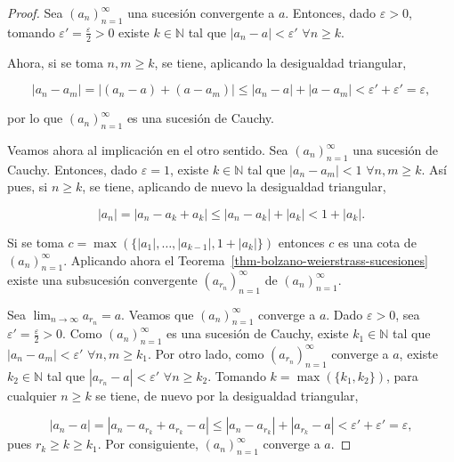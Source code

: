 \documentclass[
  a4paper,
]{scrreport}
\theoremstyle{definition}
\theoremstyle{plain}
\theoremstyle{definition}
\theoremstyle{definition}
\theoremstyle{plain}
\theoremstyle{plain}
\theoremstyle{remark}
\begin{document}
\begin{tcolorbox}[enhanced jigsaw, leftrule=.75mm, colbacktitle=quarto-callout-note-color!10!white, toprule=.15mm, opacityback=0, opacitybacktitle=0.6, toptitle=1mm, breakable, bottomtitle=1mm, colframe=quarto-callout-note-color-frame, rightrule=.15mm, titlerule=0mm, title=\textcolor{quarto-callout-note-color}{\faInfo}\hspace{0.5em}{Demostración}, arc=.35mm, left=2mm, bottomrule=.15mm, colback=white, coltitle=black]

\begin{proof}
Sea \((a_n)_{n=1}^\infty\) una sucesión convergente a \(a\). Entonces,
dado \(\varepsilon>0\), tomando \(\varepsilon'=\frac{\varepsilon}{2}>0\)
existe \(k\in\mathbb{N}\) tal que \(|a_n-a|<\varepsilon'\)
\(\forall n\geq k\).

Ahora, si se toma \(n,m\geq k\), se tiene, aplicando la desigualdad
triangular,

\[
|a_n-a_m|=|(a_n-a)+(a-a_m)| \leq |a_n-a| + |a-a_m| < \varepsilon' +\varepsilon' = \varepsilon,
\]

por lo que \((a_n)_{n=1}^\infty\) es una sucesión de Cauchy.

Veamos ahora al implicación en el otro sentido. Sea
\((a_n)_{n=1}^\infty\) una sucesión de Cauchy. Entonces, dado
\(\varepsilon=1\), existe \(k\in\mathbb{N}\) tal que \(|a_n-a_m|<1\)
\(\forall n,m\geq k\). Así pues, si \(n\geq k\), se tiene, aplicando de
nuevo la desigualdad triangular,

\[
|a_n| = |a_n-a_k+a_k| \leq |a_n-a_k|+|a_k|<1+|a_k|.
\]

Si se toma \(c=\max(\{|a_1|, \ldots, |a_{k-1}|,1+|a_k|\})\) entonces
\(c\) es una cota de \((a_n)_{n=1}^\infty\). Aplicando ahora el
Teorema~\ref{thm-bolzano-weierstrass-sucesiones} existe una subsucesión
convergente \((a_{r_n})_{n=1}^\infty\) de \((a_n)_{n=1}^\infty\).

Sea \(\lim_{n\to\infty}a_{r_n}=a\). Veamos que \((a_n)_{n=1}^\infty\)
converge a \(a\). Dado \(\varepsilon>0\), sea
\(\varepsilon'=\frac{\varepsilon}{2}>0\). Como \((a_n)_{n=1}^\infty\) es
una sucesión de Cauchy, existe \(k_1\in\mathbb{N}\) tal que
\(|a_n-a_m|<\varepsilon'\) \(\forall n,m\geq k_1\). Por otro lado, como
\((a_{r_n})_{n=1}^\infty\) converge a \(a\), existe \(k_2\in\mathbb{N}\)
tal que \(|a_{r_n}-a|<\varepsilon'\) \(\forall n\geq k_2\). Tomando
\(k=\max(\{k_1,k_2\})\), para cualquier \(n\geq k\) se tiene, de nuevo
por la desigualdad triangular,

\[
|a_n-a| = |a_n-a_{r_k}+a_{r_k}-a|\leq |a_n-a_{r_k}|+|a_{r_k}-a| < \varepsilon'+\varepsilon'=\varepsilon,
\] pues \(r_k\geq k\geq k_1\). Por consiguiente, \((a_n)_{n=1}^\infty\)
converge a \(a\).
\end{proof}

\end{tcolorbox}
\end{document}
